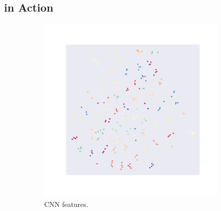 \subsection{\samp{} in Action}\label{ssec:samp-in-action}
\begin{figure}[t]
     \centering
     \begin{subfigure}[b]{0.4\textwidth}
         \centering
         \captionsetup{justification=centering}
         \includegraphics[width=\textwidth,trim=2.55cm 3cm 2.6cm 2.6cm, clip]{chapters/assets/samptr_extra/cnn_emb.pdf}
         \caption{CNN features.}
     \end{subfigure}
     \hspace{1cm}
     \begin{subfigure}[b]{0.4\textwidth}
         \centering
         \captionsetup{justification=centering}

\end{subfigure}
\end{figure}
